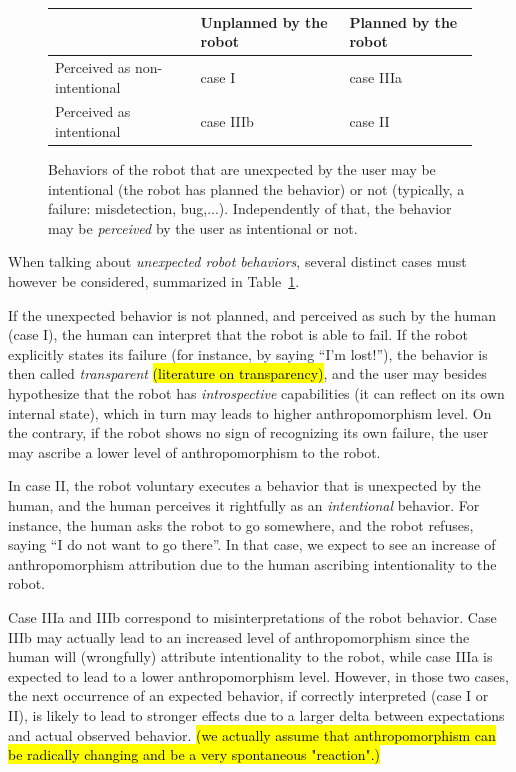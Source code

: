 \documentclass{frontiersSCNS} %
\begin{document}
\begin{figure}\footnotesize
    \begin{tabular}{  >{\centering\arraybackslash}m{2cm} | >{\centering\arraybackslash}m{2cm} | >{\centering\arraybackslash}m{2cm} }
     & Unplanned by the robot & Planned by the robot \\ \hline
    Perceived as non-intentional & case I  & case IIIa  \\ \hline
    Perceived as intentional &  case IIIb & case II 
    \end{tabular}
\caption{
    Behaviors of the robot that are unexpected by the user may be intentional
    (the robot has planned the behavior) or not (typically, a failure:
    misdetection, bug,...). Independently of that, the behavior may be
    \emph{perceived} by the user as intentional or not.}
\label{fig:perceptionUnexpectedBehavior}
\end{figure}

When talking about \emph{unexpected robot behaviors}, several distinct cases
must however be considered, summarized in
Table~\ref{fig:perceptionUnexpectedBehavior}.

If the unexpected behavior is not planned, and perceived as such by the human
(case I), the human can interpret that the robot is able to fail. If the robot
explicitly states its failure (for instance, by saying ``I'm lost!''), the
behavior is then called \emph{transparent} 
\hl{(literature on transparency)}, and the user may besides hypothesize that the
robot has \emph{introspective} capabilities (it can reflect on its own internal
state), which in turn may leads to higher anthropomorphism level.  On the
contrary, if the robot shows no sign of recognizing its own failure, the user
may ascribe a lower level of anthropomorphism to the robot.

In case II, the robot voluntary executes a behavior that is unexpected by the
human, and the human perceives it rightfully as an \emph{intentional} behavior.
For instance, the human asks the robot to go somewhere, and the robot refuses,
saying ``I do not want to go there''. In that case, we expect to see an increase
of anthropomorphism attribution due to the human ascribing intentionality to the
robot.

Case IIIa and IIIb correspond to misinterpretations of the robot behavior. Case
IIIb may actually lead to an increased level of anthropomorphism since the human
will (wrongfully) attribute intentionality to the robot, while case IIIa is
expected to lead to a lower anthropomorphism level.  However, in those two
cases, the next occurrence of an expected behavior, if correctly interpreted
(case I or II), is likely to lead to stronger effects due to a larger delta
between expectations and actual observed behavior. \hl{(we actually assume that
anthropomorphism can be radically changing and be a very spontaneous
"reaction".)}
\end{document}
